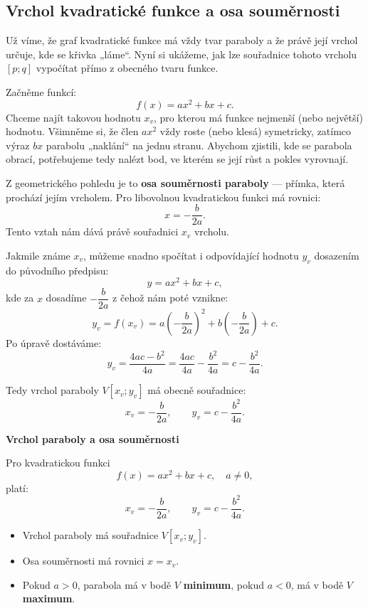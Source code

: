 \documentclass[12pt,a4paper]{article}
\begin{document}
\subsection{Vrchol kvadratické funkce a osa souměrnosti}

Už víme, že graf kvadratické funkce má vždy tvar paraboly a že právě její vrchol určuje, kde se křivka „láme“.  
Nyní si ukážeme, jak lze souřadnice tohoto vrcholu \([p; q]\) vypočítat přímo z obecného tvaru funkce.

\medskip
Začněme funkcí:
\[
f(x) = ax^2 + bx + c.
\]
Chceme najít takovou hodnotu \(x_v\), pro kterou má funkce nejmenší (nebo největší) hodnotu.  
Všimněme si, že člen \(ax^2\) vždy roste (nebo klesá) symetricky, zatímco výraz \(bx\) parabolu „naklání“ na jednu stranu.  
Abychom zjistili, kde se parabola obrací, potřebujeme tedy nalézt bod, ve kterém se její růst a pokles vyrovnají.

\medskip
Z geometrického pohledu je to \textbf{osa souměrnosti paraboly} — přímka, která prochází jejím vrcholem.  
Pro libovolnou kvadratickou funkci má rovnici:
\[
x = -\frac{b}{2a}.
\]
Tento vztah nám dává právě souřadnici \(x_v\) vrcholu.

\medskip
Jakmile známe \(x_v\), můžeme snadno spočítat i odpovídající hodnotu \(y_v\) dosazením do původního předpisu:
\[
y= ax^2 + bx +c,
\]
kde za $x$ dosadíme $-\dfrac{b}{2a}$ z čehož nám poté vznikne:
\[
y_v = f(x_v) = a\left(-\frac{b}{2a}\right)^2 + b\left(-\frac{b}{2a}\right) + c.
\]
Po úpravě dostáváme:
\[
y_v = \frac{4ac - b^2}{4a} = \frac{4ac}{4a} - \frac{b^2}{4a} = c - \frac{b^2}{4a}.
\]

\medskip
Tedy vrchol paraboly \(V[x_v; y_v]\) má obecně souřadnice:
\[
x_v = -\frac{b}{2a}, \qquad y_v = c - \frac{b^2}{4a}.
\]

\begin{definitionbox}
\textbf{Vrchol paraboly a osa souměrnosti}

Pro kvadratickou funkci
\[
f(x) = ax^2 + bx + c, \quad a \neq 0,
\]
platí:
\[
x_v = -\frac{b}{2a}, \qquad y_v = c - \frac{b^2}{4a}.
\]

\begin{itemize}
  \item Vrchol paraboly má souřadnice \(V[x_v; y_v]\).
  \item Osa souměrnosti má rovnici \(x = x_v\).
  \item Pokud \(a > 0\), parabola má v bodě \(V\) \textbf{minimum},  
        pokud \(a < 0\), má v bodě \(V\) \textbf{maximum}.
\end{itemize}
\end{definitionbox}
\end{document}
